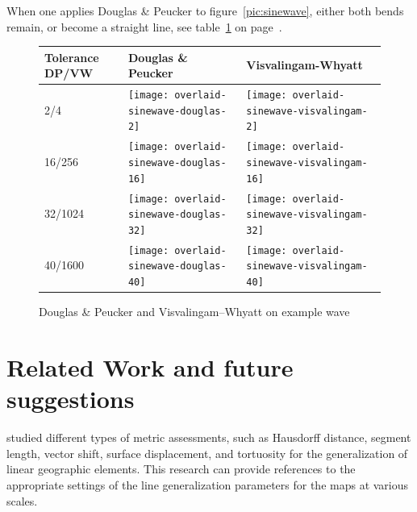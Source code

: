 \documentclass[a4paper]{article}
\newcommand{\DP}{Douglas \& Peucker}
\newcommand{\VW}{Visvalingam--Whyatt}
\begin{document}
When one applies {\DP} to figure~\ref{pic:sinewave}, either both bends remain,
or become a straight line, see table~\ref{tab:comparison-sinewave} on
page~\pageref{tab:comparison-sinewave}.

\begin{figure}[h]
    \renewcommand{\tabularxcolumn}[1]{>{\center\small}m{#1}}
    \begin{tabularx}{\textwidth}{ p{1.5cm} | X | X | }
        Tolerance DP/VW                                                      &
        Douglas \& Peucker                                                   &
        Visvalingam-Whyatt                                                   \tabularnewline \hline

        2/4                                                                  &
        \texttt{[image: overlaid-sinewave-douglas-2]}      &
        \texttt{[image: overlaid-sinewave-visvalingam-2]}  \tabularnewline \hline

        16/256                                                               &
        \texttt{[image: overlaid-sinewave-douglas-16]}     &
        \texttt{[image: overlaid-sinewave-visvalingam-16]} \tabularnewline \hline

        32/1024                                                               &
        \texttt{[image: overlaid-sinewave-douglas-32]}     &
        \texttt{[image: overlaid-sinewave-visvalingam-32]} \tabularnewline \hline

        40/1600                                                              &
        \texttt{[image: overlaid-sinewave-douglas-40]}     &
        \texttt{[image: overlaid-sinewave-visvalingam-40]} \tabularnewline \hline

    \end{tabularx}
    \caption{{\DP} and {\VW} on example wave}
    \label{tab:comparison-sinewave}
\end{figure}

\section{Related Work and future suggestions}
\label{sec:related_work}

\cite{stanislawski2012automated} studied different types of metric assessments,
such as Hausdorff distance, segment length, vector shift, surface displacement,
and tortuosity for the generalization of linear geographic elements. This
research can provide references to the appropriate settings of the line
generalization parameters for the maps at various scales.
\end{document}
